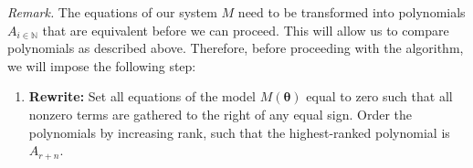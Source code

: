 \documentclass[a4paper,fleqn]{cas-dc}
\theoremstyle{definition}
\begin{document}
\setlength{\leftskip}{0.5cm}
\vspace{0.2cm}
\noindent \textit{Remark.} 
The equations of our system $M$ need to be transformed into polynomials $A_{i \in \mathbb{N}}$ that are equivalent before we can proceed. 
This will allow us to compare polynomials as described above. 
Therefore, before proceeding with the algorithm, we will impose the following step: 
\begin{enumerate}[start=0]
    \item \textbf{Rewrite:} Set all equations of the model $M(\pmb{\theta})$ equal to zero such that all nonzero terms are gathered to the right of any equal sign. 
    Order the polynomials by increasing rank, such that the highest-ranked polynomial is $A_{r+n}$. 
\end{enumerate}
\setlength{\leftskip}{0cm}
\end{document}
